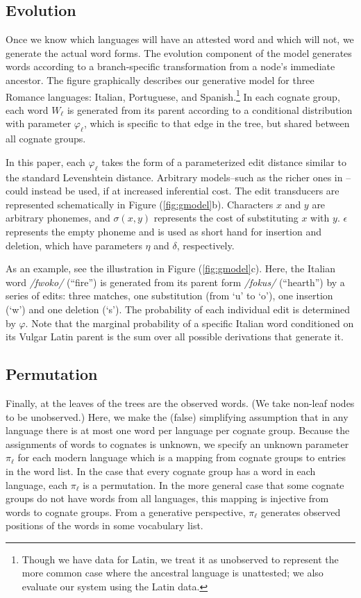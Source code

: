 \documentclass[11pt,a4paper]{article}
\begin{document}
\subsection{Evolution}

Once we know which languages will have an attested word and which
will not, we generate the actual word forms. The evolution component of
the model generates words according to a branch-specific transformation from a node's 
immediate ancestor.  The figure graphically describes our generative
model for three Romance languages: Italian, Portuguese, and Spanish.\footnote{Though we have data for Latin, we treat it
as unobserved to represent the more common case where the ancestral language is unattested; we also evaluate our system
using the Latin data.}
In each cognate group, each word $W_\ell$ is generated from its
parent according to a conditional distribution with parameter $\varphi_\ell$,
which is specific to that edge in the tree, but shared between all
cognate groups.

In this paper, each $\varphi_\ell$ takes the form of a parameterized
edit distance similar to the standard Levenshtein distance.  Arbitrary
models--such as the richer ones in --could
instead be used, if at increased inferential cost.   The edit
transducers are represented schematically in Figure (\ref{fig:gmodel}b).
Characters $x$ and $y$ are arbitrary phonemes, and $\sigma(x,y)$
represents the cost of substituting $x$ with $y$.  $\epsilon$
represents the empty phoneme and is used as short hand for insertion
and deletion, which have parameters $\eta$ and $\delta$, respectively.

As an example, see the illustration in Figure (\ref{fig:gmodel}c).
Here, the Italian word \textit{/fwoko/} (``fire'') is generated from
its parent form \textit{/fokus/} (``hearth'') by a series of edits:
three matches, one substitution (from `u' to `o'), one insertion (`w') and
one deletion (`s').  The probability of each individual edit is
determined by $\varphi$.  Note that the marginal probability of a
specific Italian word conditioned on its Vulgar Latin parent is the
sum over all possible derivations that generate it.

\subsection{Permutation}

Finally, at the leaves of the trees are the observed words. (We
take non-leaf nodes to be unobserved.) Here, we make the (false)
simplifying assumption that in any language there is at most one
word per language per cognate group. Because the assignments of
words to cognates is unknown, we specify an unknown parameter
$\pi_\ell$ for each modern language which is a mapping from cognate
groups to entries in the word list. In the case that every cognate
group has a word in each language, each $\pi_\ell$ is a permutation.
In the more general case that some cognate groups do not have words
from all languages, this mapping is injective from words to cognate
groups. From a generative perspective, $\pi_\ell$ generates observed
positions of the words in some vocabulary list.
\end{document}
